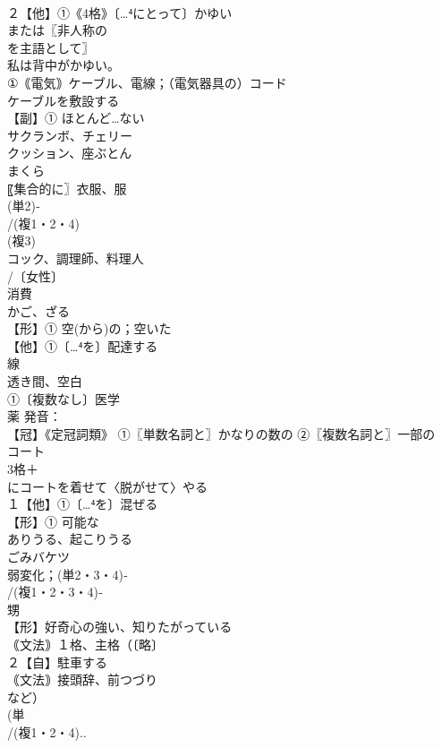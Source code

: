 \documentclass[8pt]{extreport}
\begin{document}
\begin{CJK}{UTF8}{min}
\\	２【他】①《4格》〔…⁴にとって〕かゆい 
\\	または〖非人称の
\\	を主語として〗
\\	私は背中がかゆい。
\\	①｟電気｠ケーブル、電線；（電気器具の）コード 
\\	ケーブルを敷設する
\\	【副】① ほとんど…ない 
\\	サクランボ、チェリー 
\\	クッション、座ぶとん 
\\	まくら 
\\	〖集合的に〗衣服、服 
\\	(単2)‐
\\	/(複1・2・4)
\\	(複3)
\\	コック、調理師、料理人 
\\	/〔女性〕
\\	消費 
\\	かご、ざる 
\\	【形】① 空(から)の；空いた 
\\	【他】①〔…⁴を〕配達する 
\\	線 
\\	透き間、空白 
\\	①〔複数なし〕医学 
\\	薬 発音：
\\	【冠】《定冠詞類》 ①〖単数名詞と〗かなりの数の ②〖複数名詞と〗一部の 
\\	コート 
\\	3格＋
\\	にコートを着せて〈脱がせて〉やる
\\	１【他】①〔…⁴を〕混ぜる 
\\	【形】① 可能な 
\\	ありうる、起こりうる 
\\	ごみバケツ　
\\	弱変化；(単2・3・4)‐
\\	/(複1・2・3・4)‐
\\	甥 
\\	【形】好奇心の強い、知りたがっている 
\\	｟文法｠１格、主格（〔略〕
\\	２【自】駐車する
\\	｟文法｠接頭辞、前つづり
\\	など）
\\	(単
\\	/(複1・2・4)..

\end{CJK}
\end{document}
